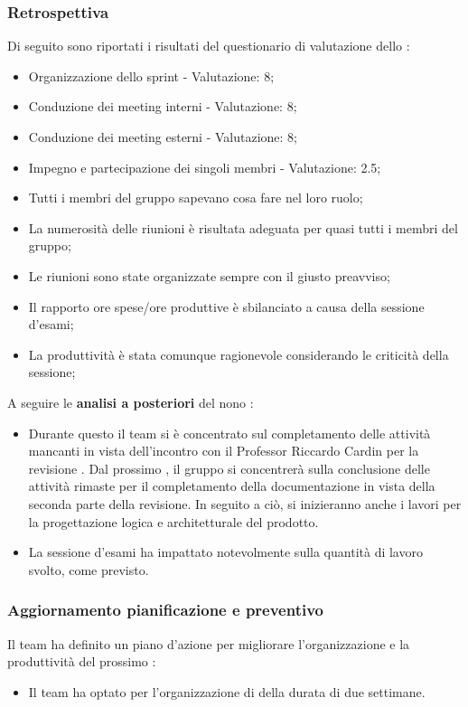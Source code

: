 \subsubsection{Retrospettiva}

\par Di seguito sono riportati i risultati del questionario di valutazione dello :
\begin{itemize}
  \item Organizzazione dello sprint - Valutazione: 8;
  \item Conduzione dei meeting interni - Valutazione: 8;
  \item Conduzione dei meeting esterni - Valutazione: 8;
  \item Impegno e partecipazione dei singoli membri - Valutazione: 2.5;
  \item Tutti i membri del gruppo sapevano cosa fare nel loro ruolo;
  \item La numerosità delle riunioni è risultata adeguata per quasi tutti i membri del gruppo;
  \item Le riunioni sono state organizzate sempre con il giusto preavviso;
  \item Il rapporto ore spese/ore produttive è sbilanciato a causa della sessione d'esami;
  \item La produttività è stata comunque ragionevole considerando le criticità della sessione;
\end{itemize}

\vspace{0.5\baselineskip}
\par A seguire le \textbf{analisi a posteriori} del nono :
\begin{itemize}
  \item Durante questo  il team si è concentrato sul completamento delle attività mancanti in vista dell'incontro con il Professor Riccardo Cardin per la revisione \RTB. Dal prossimo , il gruppo si concentrerà sulla conclusione delle attività rimaste per il completamento della documentazione in vista della seconda parte della revisione. In seguito a ciò, si inizieranno anche i lavori per la progettazione logica e architetturale del prodotto.
  \item La sessione d'esami ha impattato notevolmente sulla quantità di lavoro svolto, come previsto.
\end{itemize}

\subsubsection{Aggiornamento pianificazione e preventivo}
\par Il team ha definito un piano d'azione per migliorare l'organizzazione e la produttività del prossimo :
\begin{itemize}
  \item Il team ha optato per l'organizzazione di  della durata di due settimane.
\end{itemize}

